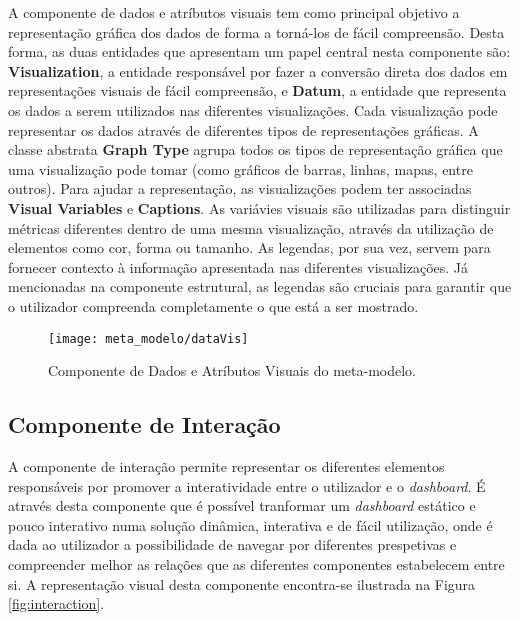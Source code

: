A componente de dados e atríbutos visuais tem como principal objetivo a representação gráfica dos dados de forma a torná-los de fácil compreensão. Desta forma, as duas entidades que apresentam um papel central nesta componente são: \textbf{Visualization}, a entidade responsável por fazer a conversão direta dos dados em representações visuais de fácil compreensão, e \textbf{Datum}, a entidade que representa os dados a serem utilizados nas diferentes visualizações. Cada visualização pode representar os dados através de diferentes tipos de representações gráficas. A classe abstrata \textbf{Graph Type} agrupa todos os tipos de representação gráfica que uma visualização pode tomar (como gráficos de barras, linhas, mapas, entre outros). Para ajudar a representação, as visualizações podem ter associadas \textbf{Visual Variables} e \textbf{Captions}. As variávies visuais são utilizadas para distinguir métricas diferentes dentro de uma mesma visualização, através da utilização de elementos como cor, forma ou tamanho. As legendas, por sua vez, servem para fornecer contexto à informação apresentada nas diferentes visualizações. Já mencionadas na componente estrutural, as legendas são cruciais para garantir que o utilizador compreenda completamente o que está a ser mostrado.

\begin{figure}[htbp]
  \texttt{[image: meta\_modelo/dataVis]}
  \centering
  \caption{Componente de Dados e Atríbutos Visuais do meta-modelo.}
  \label{fig:comp_data_vis}
\end{figure}

\subsection{Componente de Interação} %
\label{sub:int_diagram}

A componente de interação permite representar os diferentes elementos responsáveis por promover a interatividade entre o utilizador e o \textit{dashboard}. É através desta componente que é possível tranformar um \textit{dashboard} estático e pouco interativo numa solução dinâmica, interativa e de fácil utilização, onde é dada ao utilizador a possibilidade de navegar por diferentes prespetivas e compreender melhor as relações que as diferentes componentes estabelecem entre si. A representação visual desta componente encontra-se ilustrada na Figura \ref{fig:interaction}.

